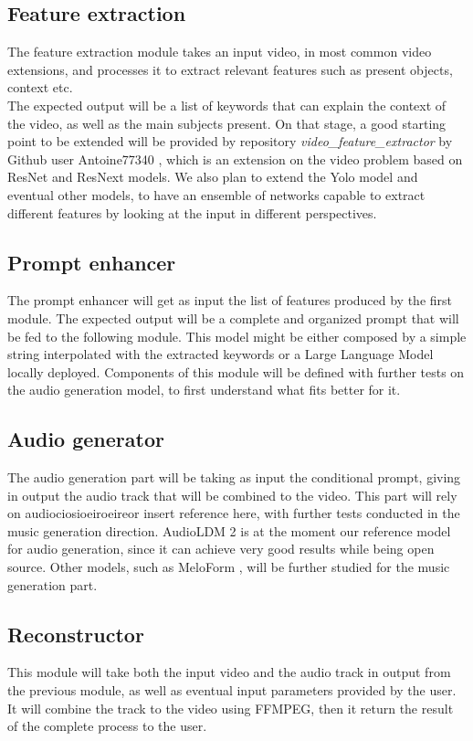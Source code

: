 \documentclass[conference]{IEEEtran}
\begin{document}
\subsection{Feature extraction}
The feature extraction module takes an input video, in most common video extensions, and processes it to extract relevant features such as present objects, context etc.\\
The expected output will be a list of keywords that can explain the context of the video, as well as the main subjects present. On that stage, a good starting point to be extended will be provided by repository \emph{video\_feature\_extractor} by Github user Antoine77340 \cite{vfe}, which is an extension on the video problem based on ResNet \cite{he2015deep} and ResNext models. We also plan to extend the Yolo \cite{wang2022yolov7} model and eventual other models, to have an ensemble of networks capable to extract different features by looking at the input in different perspectives.

\subsection{Prompt enhancer}
The prompt enhancer will get as input the list of features produced by the first module. The expected output will be a complete and organized prompt that will be fed to the following module. This model might be either composed by a simple string interpolated with the extracted keywords or a Large Language Model locally deployed. Components of this module will be defined with further tests on the audio generation model, to first understand what fits better for it. 
\subsection{Audio generator}
The audio generation part will be taking as input the conditional prompt, giving in output the audio track that will be combined to the video. This part will rely on audiociosioeiroeireor insert reference here, with further tests conducted in the music generation direction. AudioLDM 2\cite{liu2023audioldm} is at the moment our reference model for audio generation, since it can achieve very good results while being open source. Other models, such as MeloForm \cite{lu2022meloform}, will be further studied for the music generation part.
\subsection{Reconstructor}
This module will take both the input video and the audio track in output from the previous module, as well as eventual input parameters provided by the user. It will combine the track to the video using FFMPEG, then it return the result of the complete process to the user. 
\end{document}
